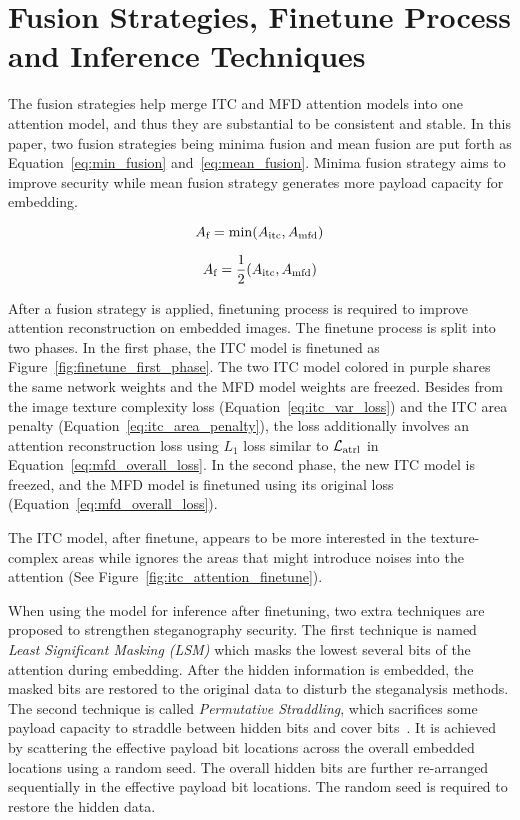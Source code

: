\section{Fusion Strategies, Finetune Process and Inference Techniques}%
\label{sec:fusion_strategies}

The fusion strategies help merge ITC and MFD attention models into one attention model, and thus they are substantial to be consistent and stable. In this paper, two fusion strategies being minima fusion and mean fusion are put forth as Equation~\ref{eq:min_fusion} and~\ref{eq:mean_fusion}. Minima fusion strategy aims to improve security while mean fusion strategy generates more payload capacity for embedding.

\begin{equation}
  A_{\text{f}} = \min(A_{\text{itc}}, A_{\text{mfd}})
  \label{eq:min_fusion}
\end{equation}

\begin{equation}
  A_{\text{f}} = \frac{1}{2}(A_{\text{itc}}, A_{\text{mfd}})
  \label{eq:mean_fusion}
\end{equation}

After a fusion strategy is applied, finetuning process is required to improve attention reconstruction on embedded images. The finetune process is split into two phases. In the first phase, the ITC model is finetuned as Figure~\ref{fig:finetune_first_phase}. The two ITC model colored in purple shares the same network weights and the MFD model weights are freezed. Besides from the image texture complexity loss (Equation~\ref{eq:itc_var_loss}) and the ITC area penalty (Equation~\ref{eq:itc_area_penalty}), the loss additionally involves an attention reconstruction loss using \(L_1\) loss similar to \( \mathcal{L}_\mathrm{atrl} \) in Equation~\ref{eq:mfd_overall_loss}. In the second phase, the new ITC model is freezed, and the MFD model is finetuned using its original loss (Equation~\ref{eq:mfd_overall_loss}).

\figureFinetuneFirstPhase%

The ITC model, after finetune, appears to be more interested in the texture-complex areas while ignores the areas that might introduce noises into the attention (See Figure~\ref{fig:itc_attention_finetune}).

\figureItcAttentionFinetune%

When using the model for inference after finetuning, two extra techniques are proposed to strengthen steganography security. The first technique is named \textit{Least Significant Masking (LSM)} which masks the lowest several bits of the attention during embedding. After the hidden information is embedded, the masked bits are restored to the original data to disturb the steganalysis methods. The second technique is called \textit{Permutative Straddling}, which sacrifices some payload capacity to straddle between hidden bits and cover bits~\cite{F5Stego}. It is achieved by scattering the effective payload bit locations across the overall embedded locations using a random seed. The overall hidden bits are further re-arranged sequentially in the effective payload bit locations. The random seed is required to restore the hidden data.
